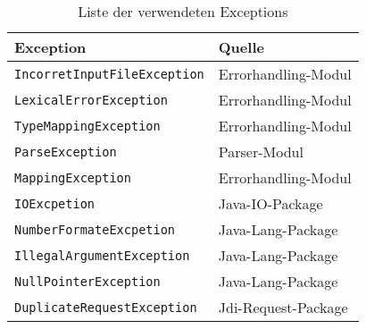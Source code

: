 \begin{table}[h]
	\centering
	
\begin{tabularx}{\textwidth}{|X|X|}
	\hline
	\textbf{Exception} & \textbf{Quelle}  \\
	\hline
	\verb+IncorretInputFileException+ & Errorhandling-Modul  \\

	\verb+LexicalErrorException+ & Errorhandling-Modul  \\

	\verb+TypeMappingException+ & Errorhandling-Modul \\

	\verb+ParseException+ & Parser-Modul \\

	\verb+MappingException+ & Errorhandling-Modul \\

	\verb+IOExcpetion+ & Java-IO-Package \\

	\verb+NumberFormateExcpetion+ & Java-Lang-Package \\

	\verb+IllegalArgumentException+ & Java-Lang-Package \\
	
	\verb+NullPointerException+ & Java-Lang-Package \\
	
	\verb+DuplicateRequestException+ & Jdi-Request-Package \\
	\hline
	
\end{tabularx}

\caption{Liste der verwendeten Exceptions \label{tab:exceptiontabel}}
\end{table}
